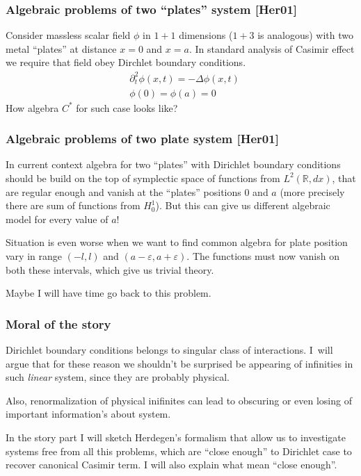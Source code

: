 \documentclass[10pt,t]{beamer}  %
\begin{document}
\begin{frame}
  \frametitle{Algebraic problems of two ``plates'' system [Her01]}


  Consider massless scalar field $\phi$ in $1 + 1$ dimensions ($1 + 3$
  is analogous) with two metal ``plates'' at distance $x = 0$ and
  $x = a$. In standard analysis of Casimir effect we require that
  field obey Dirchlet boundary conditions.
  \begin{align}
    &\partial_{ t }^{ 2 } \phi( x, t ) = -\Delta \phi( x, t ) \\
    &\phi( 0 ) = \phi( a ) = 0
  \end{align}
  How algebra $C^{ * }$ for such case looks like?

\end{frame}





\begin{frame}
  \frametitle{Algebraic problems of two plate system [Her01]}


  In current context algebra for two ``plates'' with Dirichlet
  boundary conditions should be build on the top of symplectic space
  of functions from $L^{ 2 }( \mathbb{R}, dx )$, that are regular
  enough and vanish at the ``plates'' positions $0$ and $a$ (more
  precisely there are sum of functions from $H_{ 0 }^{ 1 }$). But this
  can give us different algebraic model for every value of $a$!

  Situation is even worse when we want to find common algebra for
  plate position vary in range $( -l, l )$ and
  $( a - \varepsilon, a + \varepsilon )$. The functions must now
  vanish on both these intervals, which give us trivial theory.

  Maybe I will have time go back to this problem.

\end{frame}





\begin{frame}
  \frametitle{Moral of the story}


  Dirichlet boundary conditions belongs to singular class of
  interactions. I~will argue that for these reason we shouldn't be
  surprised be appearing of infinities in such \emph{linear} system,
  since they are probably physical.

  Also, renormalization of physical inifinites can lead to obscuring
  or even losing of important information's about system.

  In the story part I will sketch Herdegen's formalism that allow us
  to investigate systems free from all this problems, which are
  ``close enough'' to Dirichlet case to recover canonical Casimir
  term. I will also explain what mean ``close enough''.

\end{frame}
\end{document}

